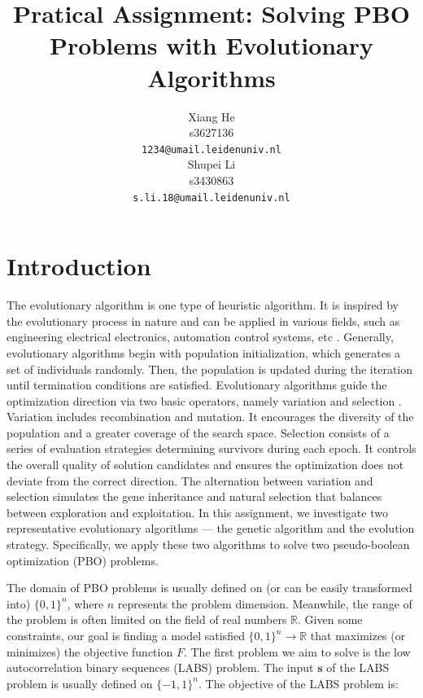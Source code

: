 \documentclass{article}
\title{Pratical Assignment: Solving PBO Problems with Evolutionary Algorithms}
\author{
 Xiang He\\
  s3627136\\
  \texttt{1234@umail.leidenuniv.nl}\\
   \And
 Shupei Li\\
  s3430863\\
  \texttt{s.li.18@umail.leidenuniv.nl} \\
}
\begin{document}
\maketitle




\section{Introduction}\label{sec:intro}
The evolutionary algorithm is one type of heuristic algorithm. It is inspired by the evolutionary process in nature and can be applied in various fields, such as engineering electrical electronics, automation control systems, etc \cite{2020slowik}. Generally, evolutionary algorithms begin with population initialization, which generates a set of individuals randomly. Then, the population is updated during the iteration until termination conditions are satisfied. Evolutionary algorithms guide the optimization direction via two basic operators, namely variation and selection \cite{2016eiben}. Variation includes recombination and mutation. It encourages the diversity of the population and a greater coverage of the search space. Selection consists of a series of evaluation strategies determining survivors during each epoch. It controls the overall quality of solution candidates and ensures the optimization does not deviate from the correct direction. The alternation between variation and selection simulates the gene inheritance and natural selection that balances between exploration and exploitation. In this assignment, we investigate two representative evolutionary algorithms --- the genetic algorithm and the evolution strategy. Specifically, we apply these two algorithms to solve two pseudo-boolean optimization (PBO) problems.

The domain of PBO problems is usually defined on (or can be easily transformed into) $\{0, 1\}^n$, where $n$ represents the problem dimension. Meanwhile, the range of the problem is often limited on the field of real numbers $\mathbb{R}$. Given some constraints, our goal is finding a model satisfied $\{0, 1\}^n\rightarrow \mathbb{R}$ that maximizes (or minimizes) the objective function $F$. The first problem we aim to solve is the low autocorrelation binary sequences (LABS) problem. The input $\mathbf{s}$ of the LABS problem is usually defined on $\{-1, 1\}^n$. The objective of the LABS problem is:
\end{document}
